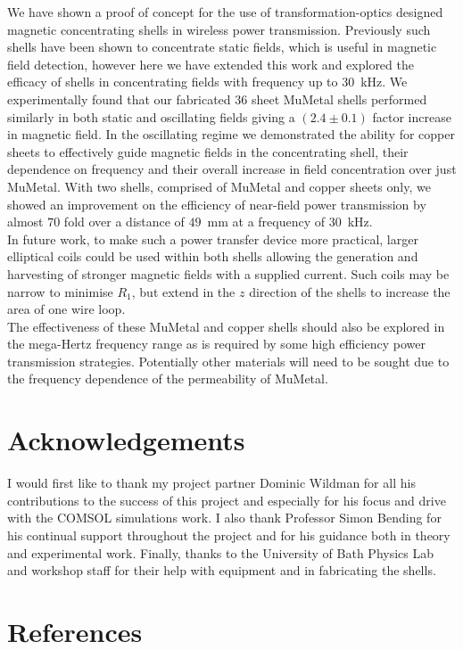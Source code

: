 \documentclass[11pt]{iopart}
\begin{document}
We have shown a proof of concept for the use of transformation-optics
designed magnetic concentrating shells in wireless power
transmission. Previously such shells have been shown to concentrate
static fields, which is useful in magnetic field detection, however here
we have extended this work and explored the efficacy of shells in
concentrating fields with frequency up to $30$~kHz. We experimentally
found that our fabricated $36$ sheet MuMetal shells performed
similarly in both static and oscillating fields giving a $(2.4\pm0.1)$
factor increase in magnetic field. In the oscillating regime we
demonstrated the ability for copper sheets to effectively guide magnetic
fields in the concentrating shell, their dependence on frequency and their
overall increase in field concentration over just MuMetal. With two
shells, comprised of MuMetal and copper sheets only, we showed an
improvement on the efficiency of near-field power transmission by
almost $70$ fold over a distance of $49$~mm at a frequency of
$30$~kHz.\\
In future work, to make such a power transfer device more practical,
larger elliptical coils could be used within both shells allowing the
generation and harvesting of stronger magnetic fields with a supplied
current. Such coils may be narrow to minimise $R_1$, but extend in the
$z$ direction of the shells to increase the area of one wire
loop.\\ The effectiveness of these MuMetal and copper shells should
also be explored in the mega-Hertz frequency range as is required by
some high efficiency power transmission
strategies\cite{Kurs2007}. Potentially other materials will need to be
sought due to the frequency dependence of the permeability of MuMetal.

\section{Acknowledgements}
I would first like to thank my project partner Dominic Wildman for all
his contributions to the success of this project and especially for
his focus and drive with the COMSOL simulations work.  I also thank
Professor Simon Bending for his continual support throughout the
project and for his guidance both in theory and experimental work.
Finally, thanks to the University of Bath Physics Lab and workshop
staff for their help with equipment and in fabricating the shells.

\section{References}




\end{document}
